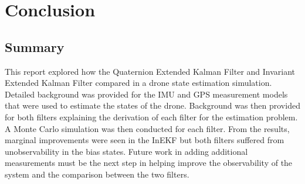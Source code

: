 \section{Conclusion}

\subsection{Summary}
This report explored how the Quaternion Extended Kalman Filter and Invariant Extended Kalman Filter compared in a drone state estimation simulation. Detailed background was provided for the IMU and GPS measurement models that were used to estimate the states of the drone. Background was then provided for both filters explaining the derivation of each filter for the estimation problem. A Monte Carlo simulation was then conducted for each filter. From the results, marginal improvements were seen in the InEKF but both filters suffered from unobservability in the bias states. Future work in adding additional measurements must be the next step in helping improve the observability of the system and the comparison between the two filters.



